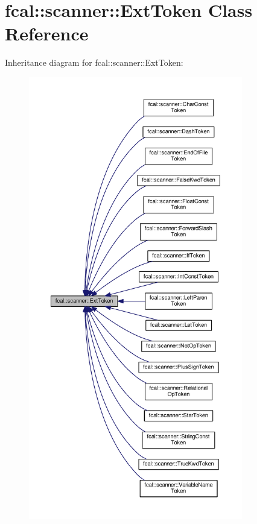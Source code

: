 \hypertarget{classfcal_1_1scanner_1_1ExtToken}{}\section{fcal\+:\+:scanner\+:\+:Ext\+Token Class Reference}
\label{classfcal_1_1scanner_1_1ExtToken}


Inheritance diagram for fcal\+:\+:scanner\+:\+:Ext\+Token\+:
\nopagebreak
\begin{figure}[H]
\begin{center}
\leavevmode
\includegraphics[height=550pt]{classfcal_1_1scanner_1_1ExtToken__inherit__graph}
\end{center}
\end{figure}
